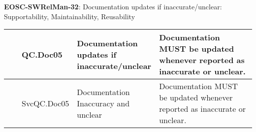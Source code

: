 \textbf{EOSC-SWRelMan-32}: Documentation updates if inaccurate/unclear: Supportability, Maintainability, Reusability
\nopagebreak[4]
\begin{center}
    \tabletail{\hline}
    \tiny
    \begin{supertabular}{|p{0.10\linewidth}|p{0.10\linewidth}|p{0.20\linewidth}|p{0.60\linewidth}|} \hline
        \cite{orviz_set_2017} & QC.Doc05 & Documentation updates if inaccurate/unclear & Documentation MUST be updated whenever reported as inaccurate or unclear.\\ \hline
        \cite{orviz_fernandez_eosc-synergy_2020} & SvcQC.Doc05 & Documentation Inaccuracy and unclear & Documentation MUST be updated whenever reported as inaccurate or unclear.\\ \hline
    \end{supertabular}
\end{center}

